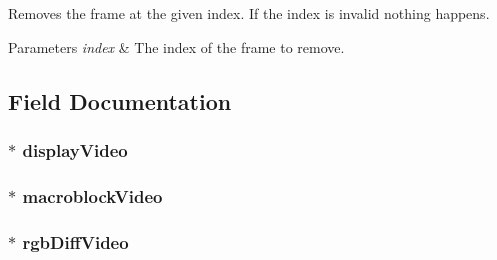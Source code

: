 Removes the frame at the given index. If the index is invalid nothing happens. 


\begin{DoxyParams}{Parameters}
{\em index} & The index of the frame to remove.\\
\hline
\end{DoxyParams}


\subsection{Field Documentation}
\hypertarget{classGUI_1_1Player_1_1Video_ab3171c486c08dcb68f05c418ec4c17ab}{}
\subsubsection[{display\+Video}]{$\ast$ display\+Video}\label{classGUI_1_1Player_1_1Video_ab3171c486c08dcb68f05c418ec4c17ab}
\hypertarget{classGUI_1_1Player_1_1Video_ac579683bc7b2499eed6704c87a211234}{}
\subsubsection[{macroblock\+Video}]{$\ast$ macroblock\+Video}\label{classGUI_1_1Player_1_1Video_ac579683bc7b2499eed6704c87a211234}
\hypertarget{classGUI_1_1Player_1_1Video_aa0602ff7e1e4796c78aa15520224b447}{}
\subsubsection[{rgb\+Diff\+Video}]{$\ast$ rgb\+Diff\+Video}\label{classGUI_1_1Player_1_1Video_aa0602ff7e1e4796c78aa15520224b447}
